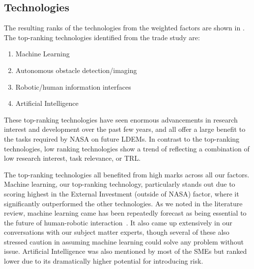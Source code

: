 \subsection{Technologies}
The resulting ranks of the technologies from the weighted factors are shown in .
The top-ranking technologies identified from the trade study are:
\begin{enumerate}
    \item Machine Learning
    \item Autonomous obstacle detection/imaging
    \item Robotic/human information interfaces
    \item Artificial Intelligence
\end{enumerate}

These top-ranking technologies have seen enormous advancements in research interest and development over the past few years, and all offer a large benefit to the tasks required by NASA on future LDEMs.
In contrast to the top-ranking technologies, low ranking technologies show a trend of reflecting a combination of low research interest, task relevance, or TRL.

The top-ranking technologies all benefited from high marks across all our factors.
Machine learning, our top-ranking technology, particularly stands out due to scoring highest in the External Investment (outside of NASA) factor, where it significantly outperformed the other technologies.
As we noted in the literature review, machine learning came has been repeatedly forecast as being essential to the future of human-robotic interaction~\citep{wang_current_2018}.
It also came up extensively in our conversations with our subject matter experts, though several of these also stressed caution in assuming machine learning could solve any problem without issue.
Artificial Intelligence was also mentioned by most of the SMEs but ranked lower due to its dramatically higher potential for introducing risk.

